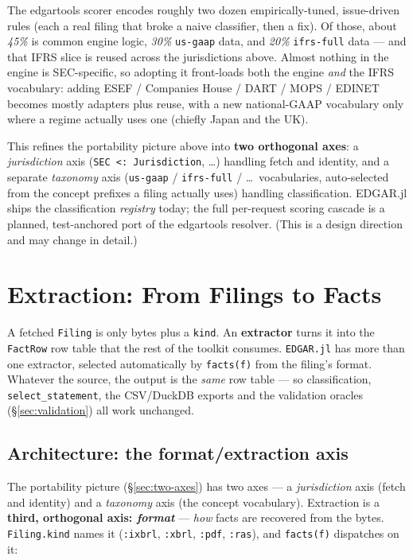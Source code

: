 \documentclass[11pt,a4paper]{report}
\begin{document}
\noindent The edgartools scorer encodes roughly two dozen empirically-tuned, issue-driven rules
(each a real filing that broke a naive classifier, then a fix). Of those, about \emph{45\%} is common
engine logic, \emph{30\%} \texttt{us-gaap} data, and \emph{20\%} \texttt{ifrs-full} data --- and that
IFRS slice is reused across the jurisdictions above. Almost nothing in the engine is SEC-specific, so
adopting it front-loads both the engine \emph{and} the IFRS vocabulary: adding ESEF / Companies House
/ DART / MOPS / EDINET becomes mostly adapters plus reuse, with a new national-GAAP vocabulary only
where a regime actually uses one (chiefly Japan and the UK).

This refines the portability picture above into \textbf{two orthogonal axes}: a \emph{jurisdiction}
axis (\texttt{SEC <: Jurisdiction}, \ldots) handling fetch and identity, and a separate
\emph{taxonomy} axis (\texttt{us-gaap} / \texttt{ifrs-full} / \ldots\ vocabularies, auto-selected from
the concept prefixes a filing actually uses) handling classification. EDGAR.jl ships the
classification \emph{registry} today; the full per-request scoring cascade is a planned, test-anchored
port of the edgartools resolver. (This is a design direction and may change in detail.)


\section{Extraction: From Filings to Facts}
\label{sys:extraction}

A fetched \texttt{Filing} is only bytes plus a \texttt{kind}. An \textbf{extractor} turns it into the
\texttt{FactRow} row table that the rest of the toolkit consumes. \texttt{EDGAR.jl} has more than one
extractor, selected automatically by \texttt{facts(f)} from the filing's format. Whatever the source,
the output is the \emph{same} row table --- so classification, \texttt{select\_statement}, the
CSV/DuckDB exports and the validation oracles (\S\ref{sec:validation}) all work unchanged.

\subsection{Architecture: the format/extraction axis}

The portability picture (\S\ref{sec:two-axes}) has two axes --- a \emph{jurisdiction} axis (fetch and
identity) and a \emph{taxonomy} axis (the concept vocabulary). Extraction is a \textbf{third,
orthogonal axis: \emph{format}} --- \emph{how} facts are recovered from the bytes. \texttt{Filing.kind}
names it (\texttt{:ixbrl}, \texttt{:xbrl}, \texttt{:pdf}, \texttt{:ras}), and \texttt{facts(f)} dispatches on it:
\end{document}
